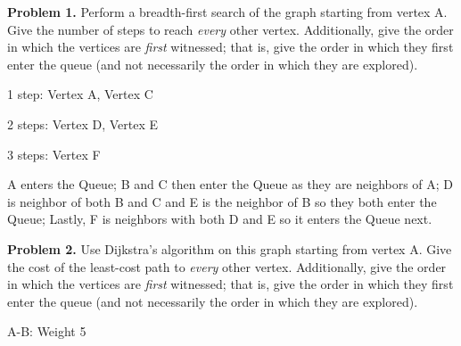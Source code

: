 \documentclass{article}
\begin{document}

\vspace*{5mm}\par\textbf{Problem 1.} Perform a breadth-first search of the graph starting from vertex A.  Give the number of steps to reach \emph{every} other vertex.  Additionally, give the order in which the vertices are \emph{first} witnessed; that is, give the order in which they first enter the queue (and not necessarily the order in which they are explored).\par


1 step: Vertex A, Vertex C

2 steps: Vertex D, Vertex E

3 steps: Vertex F

A enters the Queue; B and C then enter the Queue as they are neighbors of A;
D is neighbor of both B and C and E is the neighbor of B so they both
enter the Queue; Lastly, F is neighbors with both D and E so it enters the
Queue next.

\vspace*{10mm}\par\textbf{Problem 2.} Use Dijkstra's algorithm on this graph starting from vertex A.  Give the cost of the least-cost path to \emph{every} other vertex.  Additionally, give the order in which the vertices are \emph{first} witnessed; that is, give the order in which they first enter the queue (and not necessarily the order in which they are explored).\par

A-B: Weight 5
\end{document}
